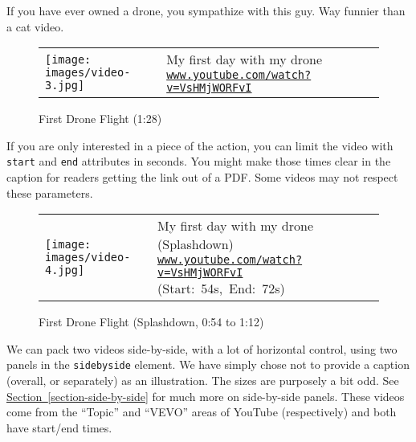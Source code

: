 \documentclass[10pt,]{article}
\theoremstyle{plain}
\theoremstyle{definition}
\theoremstyle{definition}
\theoremstyle{definition}
\theoremstyle{definition}
\theoremstyle{definition}
\theoremstyle{definition}
\numberwithin{equation}{section}
\begin{document}
\hypertarget{p-497}{}%
If you have ever owned a drone, you sympathize with this guy.  Way funnier than a cat video.%
\begin{figure}
\centering
\begin{tabular}{m{.2\linewidth}m{.6\linewidth}}
\texttt{[image: images/video-3.jpg]}&%
My first day with my drone\newline%
\href{https://www.youtube.com/watch?v=VsHMjWORFvI}{\texttt{\nolinkurl{www.youtube.com/watch?v=VsHMjWORFvI}}}
\end{tabular}
\caption{First Drone Flight (1:28)\label{figure-28}}
\end{figure}
\hypertarget{p-498}{}%
If you are only interested in a piece of the action, you can limit the video with \lstinline?start? and \lstinline?end? attributes in seconds.  You might make those times clear in the caption for readers getting the link out of a PDF.  Some videos may not respect these parameters.%
\begin{figure}
\centering
\begin{tabular}{m{.2\linewidth}m{.6\linewidth}}
\texttt{[image: images/video-4.jpg]}&%
My first day with my drone (Splashdown)\newline%
\href{https://www.youtube.com/watch?v=VsHMjWORFvI\&start=54\&end=72}{\texttt{\nolinkurl{www.youtube.com/watch?v=VsHMjWORFvI}}}
 (Start:~54s,~End:~72s)\end{tabular}
\caption{First Drone Flight (Splashdown, 0:54 to 1:12)\label{figure-29}}
\end{figure}
\hypertarget{p-499}{}%
We can pack two videos side-by-side, with a lot of horizontal control, using two panels in the \lstinline?sidebyside? element.  We have simply chose not to provide a caption (overall, or separately) as an illustration.  The sizes are purposely a bit odd.  See \hyperref[section-side-by-side]{Section~\ref{section-side-by-side}} for much more on side-by-side panels.  These videos come from the ``Topic'' and ``VEVO'' areas of YouTube (respectively) and both have start/end times.%
\end{document}

